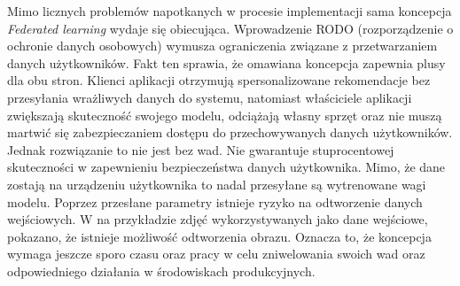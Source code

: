 Mimo licznych problemów napotkanych w procesie implementacji sama koncepcja \textit{Federated learning} wydaje się obiecująca. Wprowadzenie RODO (rozporządzenie o ochronie danych osobowych) wymusza ograniczenia związane z przetwarzaniem danych użytkowników. Fakt ten sprawia, że omawiana koncepcja zapewnia plusy dla obu stron. Klienci aplikacji otrzymują spersonalizowane rekomendacje bez przesyłania wrażliwych danych do systemu, natomiast właściciele aplikacji zwiększają skuteczność swojego modelu, odciążają własny sprzęt oraz nie muszą martwić się zabezpieczaniem dostępu do przechowywanych danych użytkowników. Jednak rozwiązanie to nie jest bez wad. Nie gwarantuje stuprocentowej skuteczności w zapewnieniu bezpieczeństwa danych użytkownika. Mimo, że dane zostają na urządzeniu użytkownika to nadal przesyłane są wytrenowane wagi modelu. Poprzez przesłane parametry istnieje ryzyko na odtworzenie danych wejściowych. W \cite{breakPrivacyFL} na przykładzie zdjęć wykorzystywanych jako dane wejściowe, pokazano, że istnieje możliwość odtworzenia obrazu. Oznacza to, że koncepcja wymaga jeszcze sporo czasu oraz pracy w celu zniwelowania swoich wad oraz odpowiedniego działania w środowiskach produkcyjnych.
